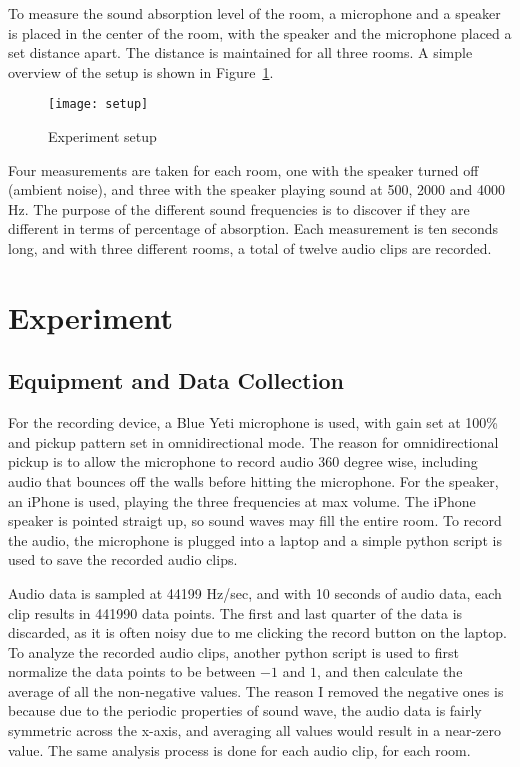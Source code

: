 \documentclass[12pt,onecolumn,letterpaper,draftclsnofoot]{article}
\newcommand{\figref}[1]{Figure~\ref{fig:#1}}
\begin{document}
To measure the sound absorption level of the room, a microphone and a speaker
is placed in the center of the room, with the speaker and the microphone
placed a set distance apart. The distance is maintained for all three rooms. A
simple overview of the setup is shown in \figref{setup}.
%
\begin{figure}
  \centering
  \texttt{[image: setup]}
  \caption{Experiment setup}
  \label{fig:setup}
\end{figure}
%
Four measurements are taken for each room, one with the speaker turned off
(ambient noise), and three with the speaker playing sound at 500, 2000 and
4000 Hz. The purpose of the different sound frequencies is to discover if they
are different in terms of percentage of absorption. Each measurement is ten 
seconds long, and with three different rooms, a total of twelve audio clips
are recorded.

\section{Experiment}

\subsection{Equipment and Data Collection}
For the recording device, a Blue Yeti microphone is used, with gain set at
100\% and pickup pattern set in omnidirectional mode. The reason for
omnidirectional pickup is to allow the microphone to record audio 360 degree
wise, including audio that bounces off the walls before hitting the
microphone. For the speaker, an iPhone is used, playing the three frequencies
at max volume. The iPhone speaker is pointed straigt up, so sound waves may
fill the entire room. To record the audio, the microphone is plugged into a
laptop and a simple python script is used to save the recorded audio clips.

Audio data is sampled at 44199 Hz/sec, and with 10 seconds of
audio data, each clip results in 441990 data points. The first and last
quarter of the data is discarded, as it is often noisy due to me clicking the
record button on the laptop. To analyze the recorded audio clips, another
python script is used to first normalize the data points to be between $-1$
and $1$, and then calculate the average of all the non-negative values. The
reason I removed the negative ones is because due to the periodic properties
of sound wave, the audio data is fairly symmetric across the x-axis, and
averaging all values would result in a near-zero value. The same analysis
process is done for each audio clip, for each room.
\end{document}
